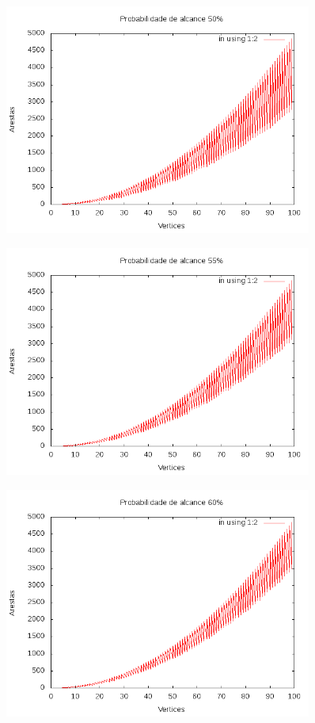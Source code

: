 \documentclass{article}
\begin{document}
\begin{figure}[h]
	\includegraphics[width=0.9\textwidth]{50.png}
\end{figure}
\begin{figure}[h]
	\includegraphics[width=0.9\textwidth]{55.png}
\end{figure}
\begin{figure}[h]
	\includegraphics[width=0.9\textwidth]{60.png}
\end{figure}
\end{document}
